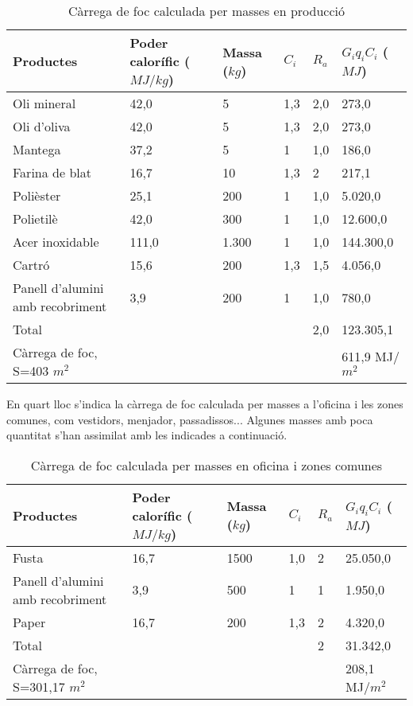 \begin{table}[H]
\small
\begin{center}
 \begin{tabu} to \textwidth {|X[1.5, l]|X[r]|X[r]|X[r]|X[r]|X[r]|}%
 \hline
Productes & Poder calorífic ($MJ/kg$)& Massa ($kg$) & $C_i$ & $R_a$ & $G_iq_{i}C_i$ ($MJ$) \\
 \hline \hline 
 Oli mineral & 42,0 & 5 & 1,3 & 2,0 & 273,0 \\ \hline
 Oli d'oliva & 42,0 & 5 & 1,3 & 2,0 & 273,0 \\ \hline
 Mantega & 37,2 & 5 & 1 & 1,0 & 186,0 \\ \hline
 Farina de blat & 16,7 & 10 & 1,3 & 2 & 217,1 \\ \hline
Polièster & 25,1 & 200 & 1 & 1,0 & 5.020,0 \\ \hline
Polietilè & 42,0 & 300 & 1 & 1,0 & 12.600,0 \\ \hline
Acer inoxidable & 111,0 & 1.300 & 1 & 1,0 & 144.300,0 \\ \hline
Cartró & 15,6 & 200 & 1,3 & 1,5 & 4.056,0 \\ \hline
Panell d'alumini amb recobriment & 3,9 & 200 & 1 & 1,0 & 780,0 \\ \hline \hline
Total & & & & 2,0 & 123.305,1 \\ \hline
Càrrega de foc, S=403 $m^2$ &  & 611,9 MJ/$m^2$ \\ \hline
 \end{tabu}
 \caption{Càrrega de foc calculada per masses en producció}
\end{center}
\end{table}

\noindent En quart lloc s'indica la càrrega de foc calculada per masses a l'oficina i les zones comunes, com vestidors, menjador, passadissos... Algunes masses amb poca quantitat s'han assimilat amb les indicades a continuació.

\begin{table}[H]
\small
\begin{center}
 \begin{tabu} to \textwidth {|X[1.5, l]|X[r]|X[r]|X[r]|X[r]|X[r]|}%
 \hline
Productes & Poder calorífic ($MJ/kg$)& Massa ($kg$) & $C_i$ & $R_a$ & $G_iq_{i}C_i$ ($MJ$) \\
 \hline \hline 
Fusta & 16,7 & 1500 & 1,0 & 2 & 25.050,0 \\ \hline
Panell d'alumini amb recobriment & 3,9 & 500 & 1 & 1 & 1.950,0 \\ \hline
Paper & 16,7 & 200 & 1,3 & 2 & 4.320,0\\ \hline \hline
Total & & & & 2 & 31.342,0 \\ \hline
Càrrega de foc, S=301,17 $m^2$ &  &  208,1 MJ/$m^2$ \\ \hline
 \end{tabu}
 \caption{Càrrega de foc calculada per masses en oficina i zones comunes}
\end{center}
\end{table}

